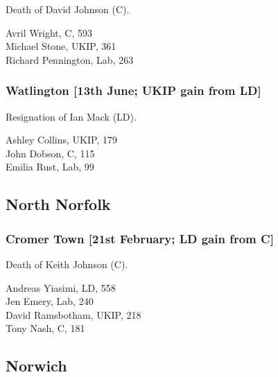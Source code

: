 \documentclass[a4paper,openany,10pt]{book}
\begin{document}

Death of David Johnson (C).



Avril Wright, C, 593\\
Michael Stone, UKIP, 361\\
Richard Pennington, Lab, 263\\


\subsubsection*{Watlington \hspace*{\fill}\nolinebreak[1]%
\enspace\hspace*{\fill}
[13th June; UKIP gain from LD]}


Resignation of Ian Mack (LD).



Ashley Collins, UKIP, 179\\
John Dobson, C, 115\\
Emilia Rust, Lab, 99\\


\subsection*{North Norfolk}

\subsubsection*{Cromer Town \hspace*{\fill}\nolinebreak[1]%
\enspace\hspace*{\fill}
[21st February; LD gain from C]}


Death of Keith Johnson (C).



Andreas Yiasimi, LD, 558\\
Jen Emery, Lab, 240\\
David Ramsbotham, UKIP, 218\\
Tony Nash, C, 181\\


\subsection*{Norwich}
\end{document}
